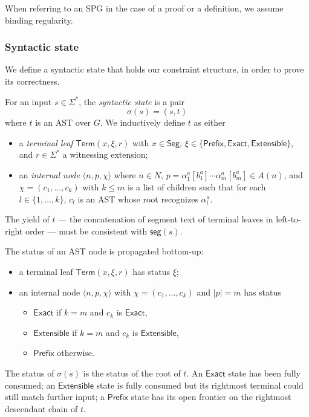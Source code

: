\noindent When referring to an SPG in the case of a proof or a definition, we assume binding regularity.

\subsubsection{Syntactic state}
We define a syntactic state that holds our constraint structure, in 
order to prove its correctness.

\begin{definition}
For an input $s \in \Sigma^*$, the \emph{syntactic state} is a pair
\[
\sigma(s) = (s, t)
\]
where $t$ is an AST over $G$. We inductively define $t$ as either
\begin{itemize}
  \item a \emph{terminal leaf} $\mathsf{Term}(x, \xi, r)$ with $x \in \mathsf{Seg}$, $\xi \in \{\mathsf{Prefix}, \mathsf{Exact}, \mathsf{Extensible}\}$, and $r \in \Sigma^*$ a witnessing extension;
  \item an \emph{internal node} $\langle n, p, \chi \rangle$ where $n \in N$, $p = \alpha_1^a[b_1^a] \cdots \alpha_m^a[b_m^a] \in A(n)$, and $\chi = (c_1, \ldots, c_k)$ with $k \le m$ is a list of children such that for each $l \in \{1, \ldots, k\}$, $c_l$ is an AST whose root recognizes $\alpha_l^a$.
\end{itemize}
The yield of $t$ — the concatenation of segment text of terminal leaves in left-to-right order — must be consistent with $\mathsf{seg}(s)$.
\end{definition}



The status of an AST node is propagated bottom-up:
\begin{itemize}
  \item a terminal leaf $\mathsf{Term}(x, \xi, r)$ has status $\xi$;
  \item an internal node $\langle n, p, \chi \rangle$ with 
    $\chi = (c_1, \ldots, c_k)$ and $|p| = m$ has status
    \begin{itemize}
      \item $\mathsf{Exact}$ if $k = m$ and $c_k$ is $\mathsf{Exact}$,
      \item $\mathsf{Extensible}$ if $k = m$ and $c_k$ is 
        $\mathsf{Extensible}$,
      \item $\mathsf{Prefix}$ otherwise.
    \end{itemize}
\end{itemize}
The status of $\sigma(s)$ is the status of the root of $t$. An
$\mathsf{Exact}$ state has been fully consumed; an $\mathsf{Extensible}$
state is fully consumed but its rightmost terminal could still match
further input; a $\mathsf{Prefix}$ state has its open frontier on the
rightmost descendant chain of $t$.

